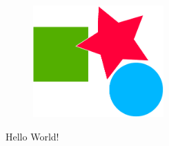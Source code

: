 \documentclass{report}
\begin{document}
\begin{figure}
    \includegraphics[width=5cm]{example.pdf}
\end{figure}

Hello World!
\end{document}
